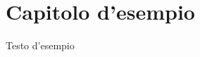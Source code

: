 \documentclass[12pt,a4paper]{book}
\begin{document}

\tableofcontents
\newpage


\listoftodos

\chapter{Capitolo d'esempio}
Testo d'esempio

\nocite{*} %


\end{document}
